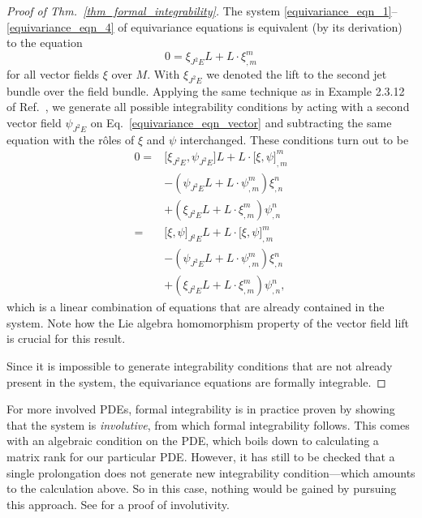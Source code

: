 \begin{proof}[Proof of Thm.~\ref{thm_formal_integrability}]
  The system \eqref{equivariance_eqn_1}--\eqref{equivariance_eqn_4} of equivariance equations is equivalent (by its derivation) to the equation
  \begin{equation}\label{equivariance_eqn_vector}
    0 = \xi_{J^2E}L + L \cdot \xi^m_{,m}
  \end{equation}
  for all vector fields $\xi$ over $M$. With $\xi_{J^2E}$ we denoted the lift to the second jet bundle over the field bundle. Applying the same technique as in Example 2.3.12 of Ref.\ \cite{Seiler_2010}, we generate all possible integrability conditions by acting with a second vector field $\psi_{J^2E}$ on Eq.\ \eqref{equivariance_eqn_vector} and subtracting the same equation with the r\^oles of $\xi$ and $\psi$ interchanged. These conditions turn out to be
  \begin{equation}
    \begin{aligned}
      0 = {} & \lbrack \xi_{J^2E}, \psi_{J^2E}\rbrack L + L\cdot \lbrack\xi,\psi\rbrack^m_{,m} \\
          {} & - \left( \psi_{J^2E}L + L \cdot \psi^m_{,m}\right) \xi^n_{,n} \\
          {} & + \left( \xi_{J^2E}L + L \cdot \xi^m_{,m}\right) \psi^n_{,n} \\
          = {} & \lbrack\xi,\psi\rbrack_{J^2E}L + L \cdot \lbrack\xi,\psi\rbrack^m_{,m} \\
          {} & - \left( \psi_{J^2E}L + L \cdot \psi^m_{,m}\right) \xi^n_{,n} \\
          {} & + \left( \xi_{J^2E}L + L \cdot \xi^m_{,m}\right) \psi^n_{,n},
    \end{aligned}
  \end{equation}
  which is a linear combination of equations that are already contained in the system. Note how the Lie algebra homomorphism property of the vector field lift is crucial for this result.

  Since it is impossible to generate integrability conditions that are not already present in the system, the equivariance equations are formally integrable.
\end{proof}

For more involved PDEs, formal integrability is in practice proven by showing that the system is \emph{involutive}, from which formal integrability follows. This comes with an algebraic condition on the PDE, which boils down to calculating a matrix rank for our particular PDE\@. However, it has still to be checked that a single prolongation does not generate new integrability condition---which amounts to the calculation above. So in this case, nothing would be gained by pursuing this approach. See \cite{Seiler_2010,Reinhart_2019} for a proof of involutivity.

